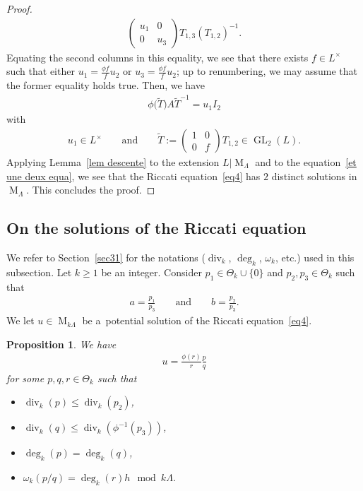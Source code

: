 \documentclass[10pt,a4paper]{amsart}
\numberwithin{equation}{section}
\newtheorem{Proposition}[Theorem]{Proposition}
{ \theoremstyle{definition}
\newtheorem{Definition}[Theorem]{Definition}
\newtheorem{Remark}[Theorem]{Remark} }
\newcommand{\divi}[1]{\operatorname{div}_{#1}}
\newcommand{\weight}[1]{\omega_{#1}}
\newcommand{\degr}[1]{\deg_{#1}}
\newcommand{\prodtheta}[1]{\Theta_{#1}}
\begin{document}
\begin{proof}
\begin{gather*}
\begin{pmatrix}
u_{1}&0
\\
0&u_{3}
\end{pmatrix}
T_{1,3} (T_{1,2} )^{-1}.
\end{gather*}
Equating the second columns in this equality, we see that there exists $f \in L^{\times}$ such that either
$u_{1}=\frac{\phi f}{f} u_{2}$ or $u_{3}=\frac{\phi f}{f} u_{2}$; up to renumbering, we may assume that the former
equality holds true.
Then, we have
\begin{gather}
\label{et une deux equa}
\phi\big(\widetilde{T}\big)A\widetilde{T}^{-1}= u_{1} I_{2}
\end{gather}
with
\begin{gather*}
u_{1} \in L^{\times} \qquad \text{and} \qquad \widetilde{T}:=
\begin{pmatrix}
1&0
\\
0&f
\end{pmatrix}
T_{1,2}\in \operatorname{GL}_{2}(L).
\end{gather*}
Applying Lemma~\ref{lem descente} to the extension $L \vert \operatorname{M}_{\Lambda}$ and to the equation~\eqref{et
une deux equa}, we see that the Riccati equation~\eqref{eq4} has $2$ distinct solutions in $\operatorname{M}_{\Lambda}$.
This concludes the proof.
\end{proof}

\subsection{On the solutions of the Riccati equation}

We refer to Section~\ref{sec31} for the notations ($\divi{k}$, $\degr{k}$, $\weight{k}$, etc.) used in this subsection.
Let $k\geq 1$ be an integer.
Consider $p_{1} \in \prodtheta{k} \cup \{0\}$ and $p_{2},p_{3} \in \prodtheta{k}$ such that
\begin{gather*}
a= \frac{p_{1}}{p_{3}} \qquad  \text{and} \qquad b = \frac{p_{2}}{p_{3}}.
\end{gather*}
We let $u \in \operatorname{M}_{k \Lambda}$ be a~potential solution of the Riccati equation~\eqref{eq4}.

\begin{Proposition}
\label{propo2}
We have
\begin{gather*}
u = \frac{\phi(r)}{r}\frac{p}{q}
\end{gather*}
for some $p,q, r\in \prodtheta{k}$ such that
\begin{itemize}
\itemsep=0pt
\item[$(i)$] $\divi{k} (p) \leq \divi{k} (p_{2})$,
\item[$(ii)$] $\divi{k} (q) \leq \divi{k} (\phi^{-1}(p_{3}))$,
\item[$(iii)$] $\degr{k} (p)=\degr{k} (q)$,
\item[$(iv)$] $\weight{k} (p/q)=\degr{k} (r) h \mod k\Lambda$.
\end{itemize}
\end{Proposition}
\end{document}
